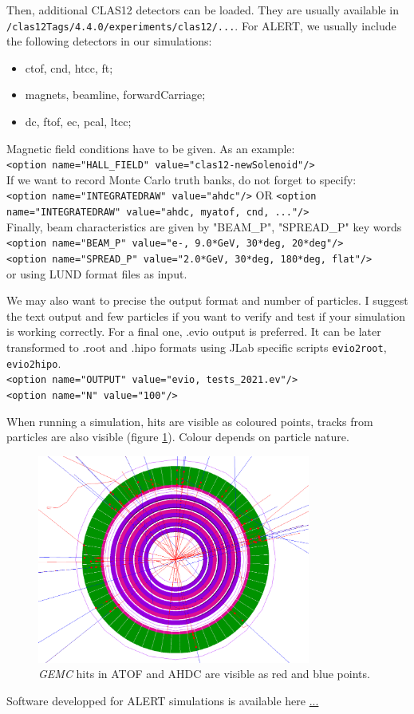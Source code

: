	Then, additional CLAS12 detectors can be loaded. They are usually available in \\ 
	\texttt{/clas12Tags/4.4.0/experiments/clas12/...}. For ALERT, we usually include the following detectors in our simulations:
	\begin{itemize}
		\item ctof, cnd, htcc, ft;
		\item magnets, beamline, forwardCarriage;
		\item dc, ftof, ec, pcal, ltcc;
	\end{itemize}
	
	Magnetic field conditions have to be given. As an example: \\
	\texttt{<option name="HALL\_FIELD"  value="clas12-newSolenoid"/>} \\
	
	If we want to record Monte Carlo truth banks, do not forget to specify: \\
	\texttt{<option name="INTEGRATEDRAW" value="ahdc"/>} OR \texttt{<option name="INTEGRATEDRAW" value="ahdc, myatof, cnd, ..."/>} \\
	
	Finally, beam characteristics are given by "BEAM\_P", "SPREAD\_P" key words \\
	\texttt{<option name="BEAM\_P" value="e-, 9.0*GeV, 30*deg, 20*deg"/> \\
	<option name="SPREAD\_P" value="2.0*GeV, 30*deg, 180*deg, flat"/>} \\
	or using LUND format files as input.
	
	We may also want to precise the output format and number of particles. I suggest the text output and few particles if you want to verify and test if your simulation is working correctly. For a final one, .evio output is preferred. It can be later transformed to .root and .hipo formats using JLab specific scripts \texttt{evio2root}, \texttt{evio2hipo}. \\
	\texttt{<option name="OUTPUT" value="evio, tests\_2021.ev"/> \\
	<option name="N" value="100"/>}
	
	When running a simulation, hits are visible as coloured points, tracks from particles are also visible (figure \ref{fig:alert_simu_example}). Colour depends on particle nature.

\begin{figure}[H]
	\centering
	\includegraphics[width=0.8\textwidth]{gemc_alert_face_withHits.png}
	\caption{\textit{GEMC} hits in ATOF and AHDC are visible as red and blue points.}
	\label{fig:alert_simu_example}
\end{figure}

Software developped for ALERT simulations is available here \url{...}